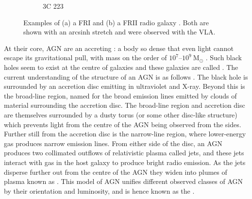 \begin{figure}
\begin{subfigure}{0.45\textwidth}
                \caption{3C 223}
                \label{fig:3C223}
            \end{subfigure}
            \caption[Examples of a FRI and a FRII radio galaxy.]{\label{fig:fri-frii} Examples of (a) a FRI \citep{laing_rotation_1987} and (b) a FRII radio galaxy \citep{leahy_vla_1991}. Both are shown with an arcsinh stretch and were observed with the VLA.}
        \end{figure}

        At their core, AGN are an accreting : a body so dense that even light cannot escape its gravitational pull, with mass on the order of $10^7$--$10^9\ \mathrm{M}_\odot$ \citeneeded{}. Such black holes seem to exist at the centre of galaxies\citeneeded{} and these galaxies are called . The current understanding of the structure of an AGN is as follows \citep{urry_unified_1995}. The black hole is surrounded by an accretion disc emitting in ultraviolet and X-ray. Beyond this is the broad-line region, named for the broad emission lines emitted by clouds of material surrounding the accretion disc. The broad-line region and accretion disc are themselves surrounded by a dusty torus (or some other disc-like structure) which prevents light from the centre of the AGN being observed from the sides. Further still from the accretion disc is the narrow-line region, where lower-energy gas produces narrow emission lines. From either side of the disc, an AGN produces two collimated outflows of relativistic plasma called {jets}, and these jets interact with gas in the host galaxy to produce bright radio emission. As the jets disperse further out from the centre of the AGN they widen into plumes of plasma known as . This model of AGN unifies different observed classes of AGN by their orientation and luminosity, and is hence known as the  \citep{antonucci_unified_1993}.

